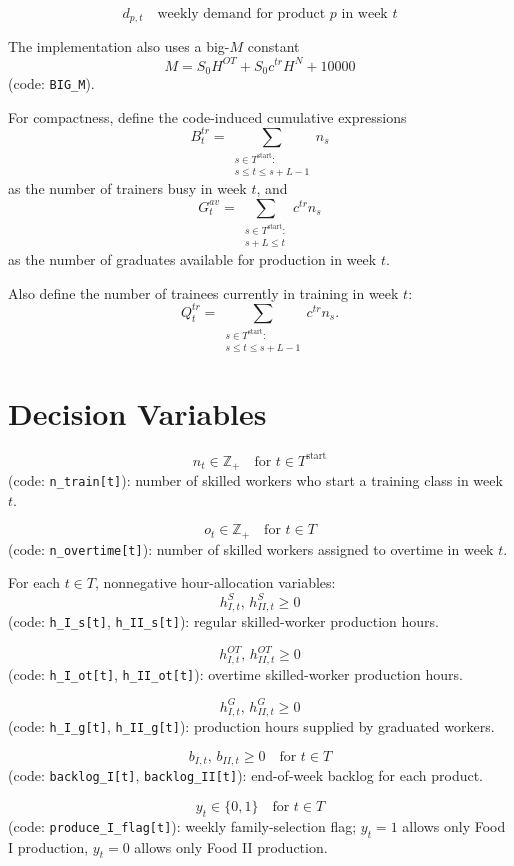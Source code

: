 \[
d_{p,t} \quad \text{weekly demand for product } p \text{ in week } t
\]

The implementation also uses a big-\(M\) constant
\[
M = S_0 H^{OT} + S_0 c^{tr} H^N + 10000
\]
(code: \texttt{BIG\_M}).

For compactness, define the code-induced cumulative expressions
\[
B_t^{tr} = \sum_{\substack{s\in T^{\text{start}}:\\ s\le t \le s+L-1}} n_s
\]
as the number of trainers busy in week \(t\), and
\[
G_t^{av} = \sum_{\substack{s\in T^{\text{start}}:\\ s+L \le t}} c^{tr} n_s
\]
as the number of graduates available for production in week \(t\).

Also define the number of trainees currently in training in week \(t\):
\[
Q_t^{tr} = \sum_{\substack{s\in T^{\text{start}}:\\ s\le t \le s+L-1}} c^{tr} n_s.
\]

\section*{Decision Variables}

\[
n_t \in \mathbb{Z}_+ \quad \text{for } t\in T^{\text{start}}
\]
(code: \texttt{n\_train[t]}): number of skilled workers who start a training class in week \(t\).

\[
o_t \in \mathbb{Z}_+ \quad \text{for } t\in T
\]
(code: \texttt{n\_overtime[t]}): number of skilled workers assigned to overtime in week \(t\).

For each \(t\in T\), nonnegative hour-allocation variables:
\[
h^S_{I,t},\, h^S_{II,t} \ge 0
\]
(code: \texttt{h\_I\_s[t]}, \texttt{h\_II\_s[t]}): regular skilled-worker production hours.

\[
h^{OT}_{I,t},\, h^{OT}_{II,t} \ge 0
\]
(code: \texttt{h\_I\_ot[t]}, \texttt{h\_II\_ot[t]}): overtime skilled-worker production hours.

\[
h^G_{I,t},\, h^G_{II,t} \ge 0
\]
(code: \texttt{h\_I\_g[t]}, \texttt{h\_II\_g[t]}): production hours supplied by graduated workers.

\[
b_{I,t},\, b_{II,t} \ge 0 \quad \text{for } t\in T
\]
(code: \texttt{backlog\_I[t]}, \texttt{backlog\_II[t]}): end-of-week backlog for each product.

\[
y_t \in \{0,1\} \quad \text{for } t\in T
\]
(code: \texttt{produce\_I\_flag[t]}): weekly family-selection flag; \(y_t=1\) allows only Food I production, \(y_t=0\) allows only Food II production.

